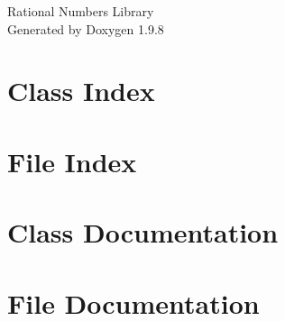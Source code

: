 \documentclass[twoside]{book}
\newcommand{\+}{\discretionary{\mbox{\scriptsize$\hookleftarrow$}}{}{}}
\newcommand{\clearemptydoublepage}{%
    \newpage{\pagestyle{empty}\cleardoublepage}%
  }
\begin{document}
  \raggedbottom
    \hypersetup{pageanchor=false,
                bookmarksnumbered=true,
                pdfencoding=unicode
               }
  \begin{titlepage}
  \vspace*{7cm}
  \begin{center}%
  {\Large Rational Numbers Library}\\
  \vspace*{1cm}
  {\large Generated by Doxygen 1.9.8}\\
  \end{center}
  \end{titlepage}
  \clearemptydoublepage
  \tableofcontents
  \clearemptydoublepage
  \hypersetup{pageanchor=true}
\chapter{Class Index}

\chapter{File Index}

\chapter{Class Documentation}

\chapter{File Documentation}


  \backmatter
  \newpage
  \clearemptydoublepage
  \printindex
\end{document}
